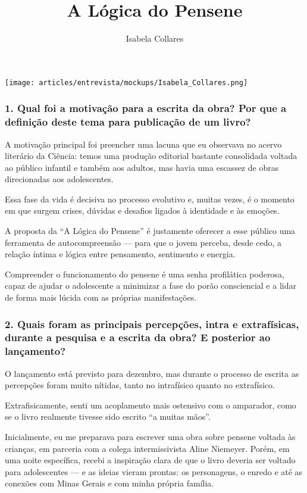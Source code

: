 \documentclass{gescons}
\author{Isabela Collares}
\title{A Lógica do Pensene}
\begin{document}
    \makeentrevistatitle

    \begin{multicols}{3}

\begin{center}
    \texttt{[image: articles/entrevista/mockups/Isabela\_Collares.png]}
\end{center}


\subsubsection{1. Qual foi a motivação para a escrita da obra? Por que a definição deste tema para publicação de um livro?}

A motivação principal foi preencher uma lacuna que eu observava no acervo literário da Ciência: temos uma produção editorial bastante consolidada voltada ao público infantil e também aos adultos, mas havia uma escassez de obras direcionadas aos adolescentes.

Essa fase da vida é decisiva no processo evolutivo e, muitas vezes, é o momento em que surgem crises, dúvidas e desafios ligados à identidade e às emoções.

A proposta da ``A Lógica do Pensene'' é justamente oferecer a esse público uma ferramenta de autocompreensão --- para que o jovem perceba, desde cedo, a relação íntima e lógica entre pensamento, sentimento e energia.

Compreender o funcionamento do pensene é uma senha profilática poderosa, capaz de ajudar o adolescente a minimizar a fase do porão consciencial e a lidar de forma mais lúcida com as próprias manifestações.


\subsubsection{2. Quais foram as principais percepções, intra e extrafísicas, durante a pesquisa e a escrita da obra? E posterior ao lançamento?}

O lançamento está previsto para dezembro, mas durante o processo de escrita as percepções foram muito nítidas, tanto no intrafísico quanto no extrafísico.

Extrafisicamente, senti um acoplamento mais ostensivo com o amparador, como se o livro realmente tivesse sido escrito ``a muitas mãos''.

Inicialmente, eu me preparava para escrever uma obra sobre pensene voltada às crianças, em parceria com a colega intermissivista Aline Niemeyer. Porém, em uma noite específica, recebi a inspiração clara de que o livro deveria ser voltado para adolescentes --- e as ideias vieram prontas: os personagens, o enredo e até as conexões com Minas Gerais e com minha própria família.


\end{multicols}
\end{document}
